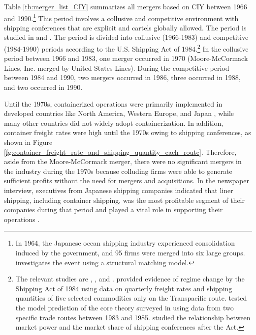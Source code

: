 \documentclass[10pt]{article}
\begin{document}
Table \ref{tb:merger_list_CIY} summarizes all mergers based on CIY between 1966 and 1990.\footnote{In 1964, the Japanese ocean shipping industry experienced consolidation induced by the government, and 95 firms were merged into six large groups. \cite{otani2021estimating} investigates the event using a structural matching model.}
This period involves a collusive and competitive environment with shipping conferences that are explicit and cartels globally allowed. 
The period is studied in \cite{matsuda2022unified} and \cite{otani2023industry}.
The period is divided into collusive (1966-1983) and competitive (1984-1990) periods according to the U.S. Shipping Act of 1984.\footnote{The relevant studies are \cite{wilson1991some}, \cite{pirrong1992application}, and \cite{clyde1998market}. \cite{wilson1991some} provided evidence of regime change by the Shipping Act of 1984 using data on quarterly freight rates and shipping quantities of five selected commodities only on the Transpacific route. \cite{pirrong1992application} tested the model prediction of the core theory surveyed in \cite{sjostrom2013competition} using data from two specific trade routes between 1983 and 1985. \cite{clyde1998market} studied the relationship between market power and the market share of shipping conferences after the Act. }
In the collusive period between 1966 and 1983, one merger occurred in 1970 (Moore-McCormack Lines, Inc. merged by United States Lines). %
During the competitive period between 1984 and 1990, two mergers occurred in 1986, three occurred in 1988, and two occurred in 1990. 

Until the 1970s, containerized operations were primarily implemented in developed countries like North America, Western Europe, and Japan \citep{GUERRERO2014151}, while many other countries did not widely adopt containerization.
In addition, container freight rates were high until the 1970s owing to shipping conferences, as shown in Figure \ref{fg:container_freight_rate_and_shipping_quantity_each_route}.
Therefore, aside from the Moore-McCormack merger, there were no significant mergers in the industry during the 1970s because colluding firms were able to generate sufficient profits without the need for mergers and acquisitions. In the newspaper interview, executives from Japanese shipping companies indicated that liner shipping, including container shipping, was the most profitable segment of their companies during that period and played a vital role in supporting their operations \citep{sato2006}.
\end{document}
